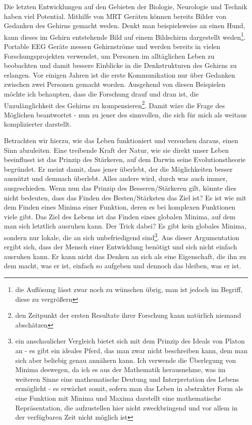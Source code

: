 \documentclass[12pt,a4paper,oneside]{article}
\begin{document}
  Die letzten Entwicklungen auf den Gebieten der Biologie, Neurologie und Technik haben viel Potential. Mithilfe von MRT Geräten können bereits Bilder von Gedanken des Gehirns gemacht weden. Denkt man beispielsweise an einen Hund, kann dieses im Gehirn entstehende Bild auf einem Bildschirm dargestellt weden\footnote{die Auflösung lässt zwar noch zu wünschen übrig, man ist jedoch im Begriff, diese zu vergrößern}. Portable EEG Geräte messen Gehirnströme und werden bereits in vielen Forschungsprojekten verwendet, um Personen im alltäglichen Leben zu beobachten und damit bessere Einblicke in die Denkstrukturen des Gehirns zu erlangen. Vor einigen Jahren ist die erste Kommunikation nur über Gedanken zwischen zwei Personen gemacht worden. Ausgehend von diesen Beispielen möchte ich behaupten, dass die Forschung drauf und dran ist, die Unzulänglichkeit des Gehirns zu kompensieren\footnote{den Zeitpunkt der ersten Resultate ihrer Forschung kann natürlich niemand abschätzen}. Damit wäre die Frage des Möglichen beantwortet - nun zu jener des sinnvollen, die sich für mich als weitaus komplizierter darstellt.
  
  Betrachten wir hierzu, wie das Leben funktioniert und versuchen daraus, einen Sinn abzuleiten. Eine treibende Kraft der Natur, wie sie direkt unser Leben beeinflusst ist das Prinzip des Stärkeren, auf dem Darwin seine Evolutionstheorie begründet. Er meint damit, dass jener überlebt, der die Möglichkeiten besser ausnützt und demnach überlebt. Alles andere wird, durch was auch immer, ausgeschieden. Wenn nun das Prinzip des Besseren/Stärkeren gilt, könnte dies nicht bedeuten, dass das Finden des Besten/Stärksten das Ziel ist? Es ist wie mit dem Finden eines Minima einer Funktion, deren es bei komplexen Funktionen viele gibt. Das Ziel des Lebens ist das Finden eines globalen Minima, auf dem man sich letztlich ausruhen kann. Der Trick dabei? Es gibt kein globales Minima, sondern nur lokale, die an sich unbefriedigend sind\footnote{ein anschaulicher Vergleich bietet sich mit dem Prinzip des Ideals von Platon an - es gibt ein ideales Pferd, das man zwar nicht beschreiben kann, dem man sich aber beliebig genau annähern kann. Ich verwende die Überlegung von Minima deswegen, da ich es aus der Mathematik herausnehme, was im weiteren Sinne eine mathematische Deutung und Interpretation des Lebens ermöglicht - es erwächst somit, sofern man das Leben in abstrakter Form als eine Funktion mit Minima und Maxima darstellt eine mathematische Repräsentation, die aufzustellen hier nicht zweckbringend und vor allem in der verfügbaren Zeit nicht möglich ist}. Aus dieser Argumentation ergibt sich, dass der Mensch einer Entwicklung benötigt und sich nicht einfach ausruhen kann. Er kann nicht das Denken an sich als eine Eigenschaft, die ihn zu dem macht, was er ist, einfach so aufgeben und dennoch das bleiben, was er ist.\\
  
\end{document}
